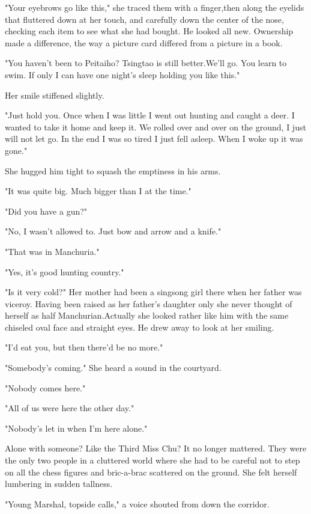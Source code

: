 \par "Your eyebrows go like this," she traced them with a finger,then along the eyelids that fluttered down at her touch, and carefully down the center of the nose, checking each item to see what she had bought. He looked all new. Ownership made a difference, the way a picture card differed from a picture in a book.
\par "You haven't been to Peitaiho? Tsingtao is still better.We'll go. You learn to swim. If only I can have one night's sleep holding you like this."
\par Her smile stiffened slightly.
\par "Just hold you. Once when I was little I went out hunting and caught a deer. I wanted to take it home and keep it. We rolled over and over on the ground, I just will not let go. In the end I was so tired I just fell asleep. When I woke up it was gone."
\par She hugged him tight to squash the emptiness in his arms.
\par "It was quite big. Much bigger than I at the time."
\par "Did you have a gun?"
\par "No, I wasn't allowed to. Just bow and arrow and a knife."
\par "That was in Manchuria."
\par "Yes, it's good hunting country."
\par "Is it very cold?" Her mother had been a singsong girl there when her father was viceroy. Having been raised as her father's daughter only she never thought of herself as half Manchurian.Actually she looked rather like him with the same chiseled oval face and straight eyes. He drew away to look at her smiling.
\par "I'd eat you, but then there'd be no more."
\par "Somebody's coming." She heard a sound in the courtyard.
\par "Nobody comes here."
\par "All of us were here the other day."
\par "Nobody's let in when I'm here alone."
\par Alone with someone? Like the Third Miss Chu? It no longer mattered. They were the only two people in a cluttered world where she had to be careful not to step on all the chess figures and bric-a-brac scattered on the ground. She felt herself lumbering in sudden tallness.
\par "Young Marshal, topside calls," a voice shouted from down the corridor.
